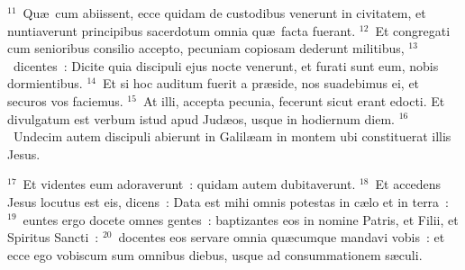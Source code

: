 ${}^{11}$~Qu\ae\ cum abiissent, ecce quidam de custodibus venerunt in civitatem, et nuntiaverunt principibus sacerdotum omnia qu\ae\ facta fuerant.
${}^{12}$~Et congregati cum senioribus consilio accepto, pecuniam copiosam dederunt militibus,
${}^{13}$~dicentes~: Dicite quia discipuli ejus nocte venerunt, et furati sunt eum, nobis dormientibus.
${}^{14}$~Et si hoc auditum fuerit a pr\ae side, nos suadebimus ei, et securos vos faciemus.
${}^{15}$~At illi, accepta pecunia, fecerunt sicut erant edocti. Et divulgatum est verbum istud apud Jud\ae os, usque in hodiernum diem.
${}^{16}$~Undecim autem discipuli abierunt in Galil\ae am in montem ubi constituerat illis Jesus.


${}^{17}$~Et videntes eum adoraverunt~: quidam autem dubitaverunt.
${}^{18}$~Et accedens Jesus locutus est eis, dicens~: Data est mihi omnis potestas in c\ae lo et in terra~:
${}^{19}$~euntes ergo docete omnes gentes~: baptizantes eos in nomine Patris, et Filii, et Spiritus Sancti~:
${}^{20}$~docentes eos servare omnia qu\ae cumque mandavi vobis~: et ecce ego vobiscum sum omnibus diebus, usque ad consummationem s\ae culi.
